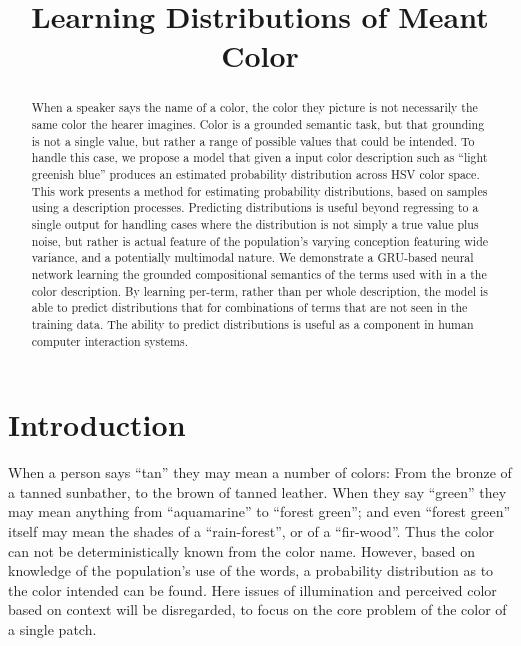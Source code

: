 \documentclass[11pt,letterpaper]{article}
\title{Learning Distributions of Meant Color}
\author{}
\date{}
\begin{document}
\maketitle

\begin{abstract}
When a speaker says the name of a color, the color they picture is not necessarily the same color the hearer imagines.
Color is a grounded semantic task, but that grounding is not a single value, but rather a range of possible values that could be intended.
To handle this case, we propose a model that given a input color description such as ``light greenish blue'' produces an estimated probability distribution across HSV color space.
This work presents a method for estimating probability distributions, based on samples using a description processes.
Predicting distributions  is useful beyond regressing to a single output for handling cases where the distribution is not simply a true value plus noise, but rather is actual feature of the population's varying conception featuring wide variance, and a potentially multimodal nature.
We demonstrate a GRU-based neural network learning the grounded compositional semantics of the terms used with in a the color description.
By learning per-term, rather than per whole description, the model is able to predict distributions that for combinations of terms that are not seen in the training data.
The ability to predict distributions is useful as a component in human computer interaction systems.


\end{abstract}

\section{Introduction}
When a person says ``tan'' they may mean a number of colors: From the bronze of a tanned sunbather, to the brown of tanned leather.
When they say ``green'' they may mean anything from ``aquamarine'' to ``forest green'';
 and even ``forest green'' itself may mean the shades of a ``rain-forest'', or of a ``fir-wood''.
Thus the color can not be deterministically known from the color name.
However, based on knowledge of the population's use of the words, a probability distribution as to the color intended can be found.
Here issues of illumination and perceived color based on context will be disregarded, to focus on the core problem of the color of a single patch.
\end{document}

